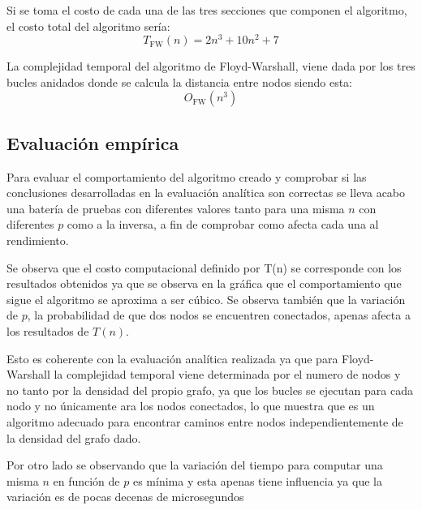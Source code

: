 Si se toma el costo de cada una de las tres secciones que componen el algoritmo, el costo total del algoritmo sería:
\begin{equation}
    T_{\mathrm{FW}}(n) = 2n^3 + 10n^2 + 7
\end{equation}

La complejidad temporal del algoritmo de Floyd-Warshall, viene dada por los tres bucles anidados donde se calcula la distancia entre nodos  siendo esta:
\begin{equation}
    O_{\mathrm{FW}}(n^3) 
\end{equation}

\subsection*{Evaluación empírica}

Para evaluar el comportamiento del algoritmo creado y comprobar si las conclusiones desarrolladas en la evaluación analítica son correctas se lleva acabo una batería de pruebas con diferentes valores tanto para una misma $n$ con diferentes $p$ como a la inversa, a fin de comprobar como afecta cada una al rendimiento.


Se observa que el costo computacional definido por T(n) se corresponde con los resultados obtenidos ya que se observa en la gráfica que el comportamiento que sigue el algoritmo se aproxima a ser cúbico. Se observa también que la variación de $p$, la probabilidad de que dos nodos se encuentren conectados, apenas  afecta a los resultados de $T(n)$.

Esto es coherente con la evaluación analítica realizada ya que para Floyd-Warshall la complejidad temporal viene determinada por el numero de nodos y no tanto por la densidad del propio grafo, ya que los bucles se ejecutan para cada nodo y no únicamente ara los nodos conectados, lo que muestra que es un algoritmo adecuado para encontrar caminos entre nodos independientemente de la densidad del grafo dado.

Por otro lado se observando que la variación del tiempo para computar una misma $n$ en función de $p$ es mínima y esta apenas tiene influencia ya que la variación es de pocas decenas de microsegundos
